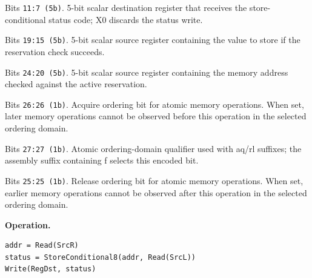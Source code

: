 \begin{description}[leftmargin=0.18\linewidth,style=nextline]
\item[\texttt{RegDst}] Bits \texttt{11:7 (5b)}. 5-bit scalar destination register that receives the store-conditional status code; X0 discards the status write.
\item[\texttt{SrcL}] Bits \texttt{19:15 (5b)}. 5-bit scalar source register containing the value to store if the reservation check succeeds.
\item[\texttt{SrcR}] Bits \texttt{24:20 (5b)}. 5-bit scalar source register containing the memory address checked against the active reservation.
\item[\texttt{aq}] Bits \texttt{26:26 (1b)}. Acquire ordering bit for atomic memory operations. When set, later memory operations cannot be observed before this operation in the selected ordering domain.
\item[\texttt{far}] Bits \texttt{27:27 (1b)}. Atomic ordering-domain qualifier used with aq/rl suffixes; the assembly suffix containing f selects this encoded bit.
\item[\texttt{rl}] Bits \texttt{25:25 (1b)}. Release ordering bit for atomic memory operations. When set, earlier memory operations cannot be observed after this operation in the selected ordering domain.
\end{description}
\noindent\textbf{Operation.}\par
\begin{lstlisting}[style=ptoscalarcode]
addr = Read(SrcR)
status = StoreConditional8(addr, Read(SrcL))
Write(RegDst, status)
\end{lstlisting}
\Needspace{0.08\textheight}
